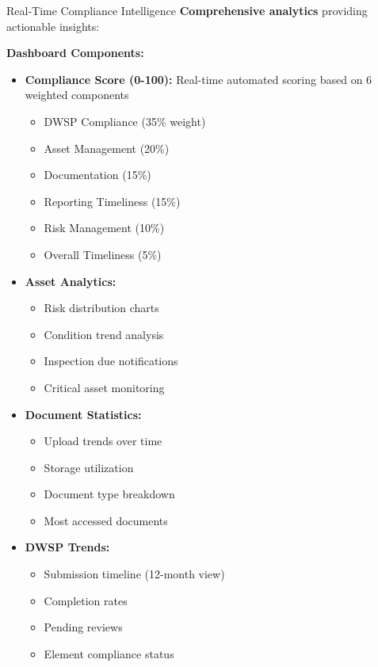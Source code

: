 \documentclass[11pt,a4paper]{article}
\begin{document}
\begin{featurebox}{Real-Time Compliance Intelligence}
    \textbf{Comprehensive analytics} providing actionable insights:

    \vspace{0.5cm}
    \textbf{Dashboard Components:}

    \begin{itemize}[itemsep=0.5em]
        \item \textbf{Compliance Score (0-100):} Real-time automated scoring based on 6 weighted components
        \begin{itemize}
            \item DWSP Compliance (35\% weight)
            \item Asset Management (20\%)
            \item Documentation (15\%)
            \item Reporting Timeliness (15\%)
            \item Risk Management (10\%)
            \item Overall Timeliness (5\%)
        \end{itemize}

        \item \textbf{Asset Analytics:}
        \begin{itemize}
            \item Risk distribution charts
            \item Condition trend analysis
            \item Inspection due notifications
            \item Critical asset monitoring
        \end{itemize}

        \item \textbf{Document Statistics:}
        \begin{itemize}
            \item Upload trends over time
            \item Storage utilization
            \item Document type breakdown
            \item Most accessed documents
        \end{itemize}

        \item \textbf{DWSP Trends:}
        \begin{itemize}
            \item Submission timeline (12-month view)
            \item Completion rates
            \item Pending reviews
            \item Element compliance status
        \end{itemize}


\end{itemize}
\end{featurebox}
\end{document}
